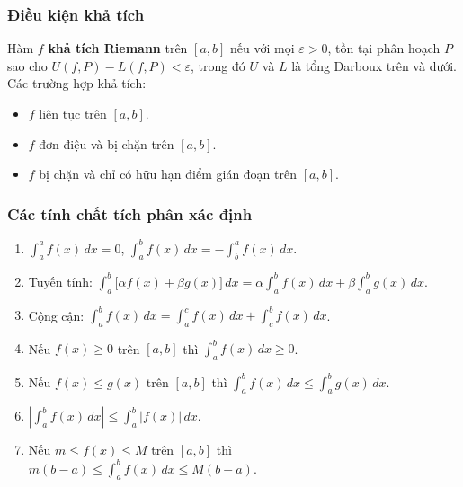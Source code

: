 \documentclass[12pt,a4paper]{article}
\begin{document}
\subsubsection{Điều kiện khả tích}

\begin{dinhly}
  Hàm $f$ \textbf{khả tích Riemann} trên $[a,b]$ nếu với mọi $\varepsilon > 0$, tồn tại phân hoạch $P$ sao cho $U(f, P) - L(f, P) < \varepsilon$, trong đó $U$ và $L$ là tổng Darboux trên và dưới. Các trường hợp khả tích:
  \begin{itemize}
    \item $f$ liên tục trên $[a,b]$.
    \item $f$ đơn điệu và bị chặn trên $[a,b]$.
    \item $f$ bị chặn và chỉ có hữu hạn điểm gián đoạn trên $[a,b]$.
  \end{itemize}
\end{dinhly}

\subsubsection{Các tính chất tích phân xác định}

\begin{tinhchat}
  \begin{enumerate}
    \item $\displaystyle\int_a^a f(x)\,dx = 0$, \quad $\displaystyle\int_a^b f(x)\,dx = -\int_b^a f(x)\,dx$.
    \item Tuyến tính: $\displaystyle\int_a^b \bigl[\alpha f(x) + \beta g(x)\bigr]\,dx = \alpha\int_a^b f(x)\,dx + \beta\int_a^b g(x)\,dx$.
    \item Cộng cận: $\displaystyle\int_a^b f(x)\,dx = \int_a^c f(x)\,dx + \int_c^b f(x)\,dx$.
    \item Nếu $f(x) \ge 0$ trên $[a,b]$ thì $\displaystyle\int_a^b f(x)\,dx \ge 0$.
    \item Nếu $f(x) \le g(x)$ trên $[a,b]$ thì $\displaystyle\int_a^b f(x)\,dx \le \int_a^b g(x)\,dx$.
    \item $\left|\displaystyle\int_a^b f(x)\,dx\right| \le \int_a^b |f(x)|\,dx$.
    \item Nếu $m \le f(x) \le M$ trên $[a,b]$ thì $m(b - a) \le \displaystyle\int_a^b f(x)\,dx \le M(b - a)$.
  \end{enumerate}
\end{tinhchat}
\end{document}
